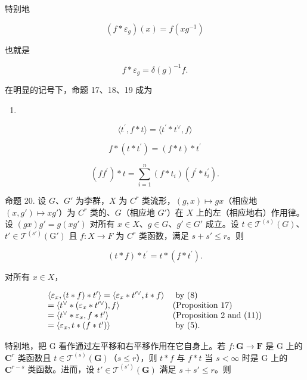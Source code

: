 特别地

\[
(f * \varepsilon_ {g}) (x) = f (x g ^ {- 1})\tag{9}
\]

也就是

\[
f * \varepsilon_ {g} = \delta (g) ^ {- 1} f.\tag{10}
\]

在明显的记号下，命题 17、18、19 成为

\begin{enumerate}
\def\labelenumi{(\arabic{enumi})}
\setcounter{enumi}{10}
\tightlist
\item
\end{enumerate}

\[
\langle t ^ {\prime}, f * t \rangle = \langle t ^ {\prime} * t ^ {\vee}, f \rangle\tag{11}
\]

\[
f * (t * t ^ {\prime}) = (f * t) * t ^ {\prime}\tag{12}
\]

\[
(f f ^ {\prime}) * t = \sum_ {i = 1} ^ {n} (f * t _ {i}) (f ^ {\prime} * t _ {i} ^ {\prime}).\tag{13}
\]

命题 20. 设 \(G\)、\(G'\) 为李群，\(X\) 为 \(C^r\) 类流形，\((g, x) \mapsto gx\)（相应地 \((x, g') \mapsto xg'\)）为 \(C^r\) 类的、\(G\)（相应地 \(G'\)）在 \(X\) 上的左（相应地右）作用律。设 \((gx)g' = g(xg')\) 对所有 \(x \in X\)、\(g \in G\)、\(g' \in G'\) 成立。设 \(t \in \mathcal{T}^{(s)}(G)\)、\(t' \in \mathcal{T}^{(s')}(\mathrm{G}')\) 且 \(f: X \to F\) 为 \(C^r\) 类函数，满足 \(s + s' \leqslant r\)。则

\[
(t * f) * t ^ {\prime} = t * (f * t ^ {\prime}).
\]

对所有 \(x \in X\)，

\[
\begin{array}{l l} \langle \varepsilon_ {x}, (t * f) * t ^ {\prime} \rangle = \langle \varepsilon_ {x} * t ^ {\prime \vee}, t * f \rangle & \text { by   (8) } \\ = \langle t ^ {\vee} * (\varepsilon_ {x} * t ^ {\prime \vee}), f \rangle & \text {(Proposition 17)} \\ = \langle t ^ {\vee} * \varepsilon_ {x}, f * t ^ {\prime} \rangle & \text {(Proposition 2 and (11))} \\ = \langle \varepsilon_ {x}, t * (f * t ^ {\prime}) \rangle & \text { by   (5). } \end{array}
\]

特别地，把 G 看作通过左平移和右平移作用在它自身上。若 \(f \colon \mathbf{G} \to \mathbf{F}\) 是 G 上的 \(\mathbf{C}^r\) 类函数且 \(t \in \mathcal{T}^{(s)}(\mathbf{G})\)（\(s \leqslant r\)），则 \(t * f\) 与 \(f * t\) 当 \(s < \infty\) 时是 G 上的 \(\mathbf{C}^{r - s}\) 类函数。进而，设 \(t' \in \mathcal{T}^{(s')}(\mathbf{G})\) 满足 \(s + s' \leqslant r\)。则

